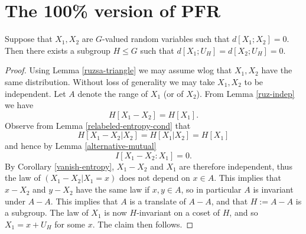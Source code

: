 \chapter{The 100\% version of PFR}

\begin{lemma}\label{lem:100pc}
  Suppose that $X_1,X_2$ are $G$-valued random variables such that
  $d[X_1;X_2]=0$. Then there exists a subgroup $H \leq G$ such that $d[X_1;U_H] = d[X_2;U_H] = 0$.
\end{lemma}

\begin{proof}
Using Lemma \ref{ruzsa-triangle} we may assume wlog that $X_1,X_2$ have the same distribution.
   Without loss of generality we may take $X_1,X_2$ to be independent.  Let $A$ denote the range of $X_1$ (or of $X_2$).  From Lemma \ref{ruz-indep} we have
  $$ H[X_1-X_2] = H[X_1].$$
Observe from Lemma \ref{relabeled-entropy-cond} that
$$ H[X_1-X_2|X_2] = H[X_1|X_2] = H[X_1]$$
and hence by Lemma \ref{alternative-mutual}
$$ I[ X_1-X_2 : X_1 ] = 0.$$
By Corollary \ref{vanish-entropy}, $X_1-X_2$ and $X_1$ are therefore independent, thus the law of $(X_1-X_2|X_1=x)$ does not depend on $x \in A$.  This implies that $x-X_2$ and $y-X_2$ have the same law if $x,y \in A$, so in particular $A$ is invariant under $A-A$.  This implies that $A$ is a translate of $A-A$, and that $H := A-A$ is a subgroup.  The law of $X_1$ is now $H$-invariant on a coset of $H$, and so $X_1 = x + U_H$ for some $x$.  The claim then follows.
\end{proof}
